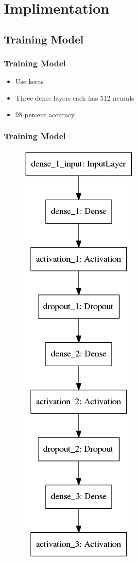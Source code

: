 
\section{Implimentation}

\subsection{Training Model}

\begin{frame}  
    \frametitle{Training Model}
	\begin{itemize}
		\item Use keras
		\item Three dense layers each has 512 neurals
		\item 98 percent accuracy
	\end{itemize}
\end{frame}

\begin{frame}
	\frametitle{Training Model}
	\begin{figure}
		\includegraphics[scale=0.2]{figure/model_structure.png}
	\end{figure}
\end{frame}
